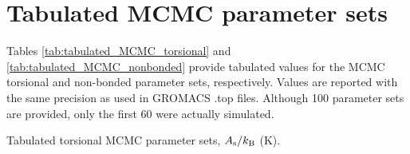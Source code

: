 \documentclass[preprint,review,11pt]{elsarticle}
\begin{document}
	\clearpage
	\newpage
	
	\section{Tabulated MCMC parameter sets} \label{SI:Tabulated_MCMC}
	
	Tables \ref{tab:tabulated_MCMC_torsional} and \ref{tab:tabulated_MCMC_nonbonded} provide tabulated values for the MCMC torsional and non-bonded parameter sets, respectively. Values are reported with the same precision as used in GROMACS .top files. Although 100 parameter sets are provided, only the first 60 were actually simulated.
	
	\begin{table}[h!]
		\caption{Tabulated torsional MCMC parameter sets, $A_{\rm s}/k_{\rm B}$ (K).} \label{tab:tabulated_MCMC_torsional}
	\end{table}
	
\end{document}
